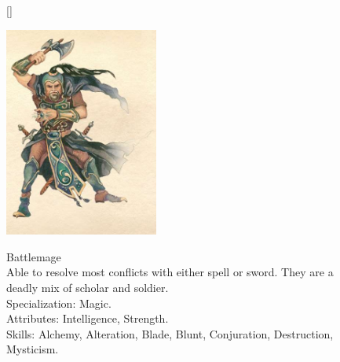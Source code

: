 \documentclass[12pt]{book}
\begin{document}
\begin{figure}[H]
[\FBwidth]
{\caption*{Battlemage\\

Able to resolve most conflicts with either spell or sword. They are a deadly mix of scholar and soldier.\\

Specialization: Magic.\\

Attributes: Intelligence, Strength.\\

Skills: Alchemy, Alteration, Blade, Blunt, Conjuration, Destruction, Mysticism.}\label{fig:test}}
{\includegraphics[width=0.45\textwidth]{Battlemage.png}}
\end{figure}
\end{document}
